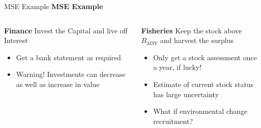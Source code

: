 \begin{frame}{MSE Example}
      \smallskip\textbf{MSE Example}\smallskip\\
     \begin{columns}[t] %
     \begin{column}[T]{5cm} %
        \smallskip\textbf{Finance} Invest the Capital and live off Interest\smallskip\\
        \Fontviii
       \begin{itemize}
         \item Get a bank statement as required
         \item {\color{red} Warning!} Investments can decrease as well as increase in value 
       \end{itemize}        
     \end{column}
     \begin{column}[T]{5cm} %
      \smallskip\textbf{Fisheries} Keep the stock above $B_{MSY}$ and harvest the surplus\smallskip\\
       \Fontviii
       \begin{itemize}[<+->]
         \item Only get a stock assessment once a year, if lucky!
         \item Estimate of current stock status has large uncertainty  
         \item What if environmental change recruitment? 
       \end{itemize}        
     \end{column}
     \end{columns}    
\end{frame}



